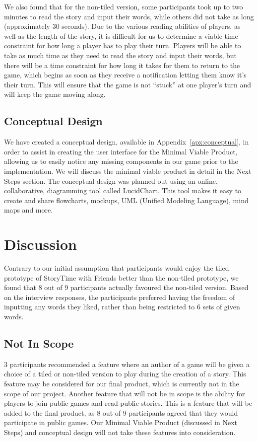 \documentclass{sigchi}
\begin{document}
We also found that for the non-tiled version, some participants took up to two minutes to read the story and input their words, while others did not take as long (approximately 30 seconds). Due to the various reading abilities of players, as well as the length of the story, it is difficult for us to determine a viable time constraint for how long a player has to play their turn. Players will be able to take as much time as they need to read the story and input their words, but there will be a time constraint for how long it takes for them to return to the game, which begins as soon as they receive a notification letting them know it's their turn. This will ensure that the game is not ``stuck'' at one player's turn and will keep the game moving along. 


\subsection{Conceptual Design}
We have created a conceptual design, available in Appendix~\ref{apx:conceptual}, in order to assist in creating the user interface for the Minimal Viable Product, allowing us to easily notice any missing components in our game prior to the implementation. We will discuss the minimal viable product in detail in the Next Steps section. The conceptual design was planned out using an online, collaborative, diagramming tool called LucidChart. This tool makes it easy to create and share flowcharts, mockups, UML (Unified Modeling Language), mind maps and more.

\section{Discussion}
Contrary to our initial assumption that participants would enjoy the tiled prototype of StoryTime with Friends better than the non-tiled prototype, we found that 8 out of 9 participants actually favoured the non-tiled version. Based on the interview responses, the participants preferred having the freedom of inputting any words they liked, rather than being restricted to 6 sets of given words. 

\subsection{Not In Scope}
3 participants recommended a feature where an author of a game will be given a choice of a tiled or non-tiled version to play during the creation of a story. This feature may be considered for our final product, which is currently not in the scope of our project. Another feature that will not be in scope is the ability for players to join public games and read public stories. This is a feature that will be added to the final product, as 8 out of 9 participants agreed that they would participate in public games. Our Minimal Viable Product (discussed in Next Steps) and conceptual design will not take these features into consideration.
\end{document}

